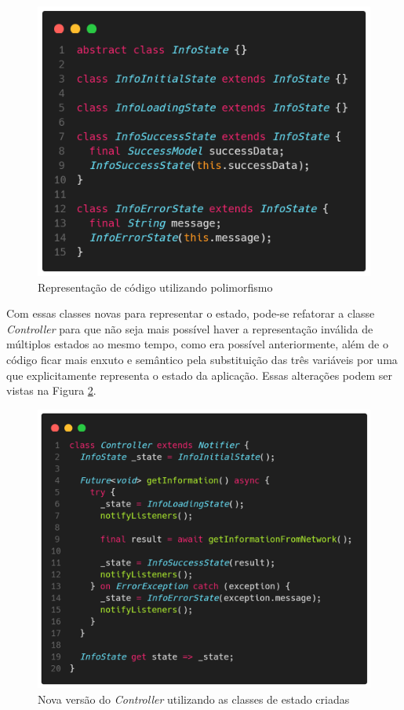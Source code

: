 \documentclass[12pt, %
openright, 
oneside, %
a4paper,    %
brazil]{facom-ufu-abntex2}
\begin{document}
\begin{figure}[ht]
    \centering
    \includegraphics[width=.65\textwidth, trim={0 30 0 100}, clip]{figures/states/states.png}
    \caption{Representação de código utilizando polimorfismo}
    \label{fig:states}
\end{figure}

Com essas classes novas para representar o estado, pode-se refatorar a classe \textit{Controller} para que não seja mais possível haver a representação inválida de múltiplos estados ao mesmo tempo, como era possível anteriormente, além de o código ficar mais enxuto e semântico pela substituição das três variáveis por uma que explicitamente representa o estado da aplicação. Essas alterações podem ser vistas na Figura \ref{fig:controller_with_states}.

\begin{figure}[ht]
    \centering
    \includegraphics[width=.65\textwidth, trim={0 30 0 100}, clip]{figures/states/controller_with_states.png}
    \caption{Nova versão do \textit{Controller} utilizando as classes de estado criadas}
    \label{fig:controller_with_states}
\end{figure}
\end{document}
